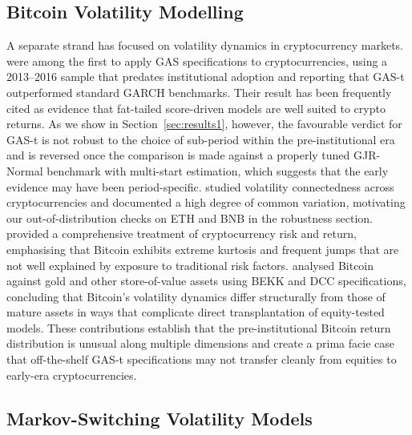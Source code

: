 \subsection{Bitcoin Volatility Modelling}

A separate strand has focused on volatility dynamics in cryptocurrency markets. \citet{catania2017} were among the first to apply GAS specifications to cryptocurrencies, using a 2013--2016 sample that predates institutional adoption and reporting that GAS-t outperformed standard GARCH benchmarks. Their result has been frequently cited as evidence that fat-tailed score-driven models are well suited to crypto returns. As we show in Section~\ref{sec:results1}, however, the favourable verdict for GAS-t is not robust to the choice of sub-period within the pre-institutional era and is reversed once the comparison is made against a properly tuned GJR-Normal benchmark with multi-start estimation, which suggests that the early evidence may have been period-specific. \citet{yi2018} studied volatility connectedness across cryptocurrencies and documented a high degree of common variation, motivating our out-of-distribution checks on ETH and BNB in the robustness section. \citet{liu2021} provided a comprehensive treatment of cryptocurrency risk and return, emphasising that Bitcoin exhibits extreme kurtosis and frequent jumps that are not well explained by exposure to traditional risk factors. \citet{klein2018} analysed Bitcoin against gold and other store-of-value assets using BEKK and DCC specifications, concluding that Bitcoin's volatility dynamics differ structurally from those of mature assets in ways that complicate direct transplantation of equity-tested models. These contributions establish that the pre-institutional Bitcoin return distribution is unusual along multiple dimensions and create a prima facie case that off-the-shelf GAS-t specifications may not transfer cleanly from equities to early-era cryptocurrencies.

\subsection{Markov-Switching Volatility Models}

